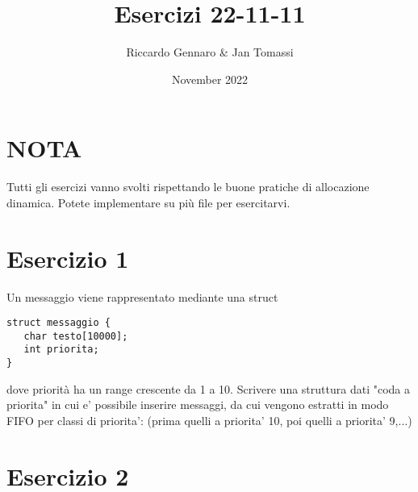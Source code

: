 \documentclass{article}
\title{Esercizi 22-11-11}
\author{Riccardo Gennaro & Jan Tomassi}
\date{November 2022}
\begin{document}
\maketitle

\section*{NOTA}

Tutti gli esercizi vanno svolti rispettando le buone pratiche di allocazione dinamica. Potete implementare su più file per esercitarvi.

\section*{Esercizio 1}

Un messaggio viene rappresentato mediante una struct \\

\begin{verbatim}
struct messaggio {
   char testo[10000];
   int priorita;
}    
\end{verbatim}

dove priorità ha un range crescente da 1 a 10.
Scrivere una struttura dati "coda a priorita" in cui e' possibile inserire messaggi, da cui vengono estratti in modo FIFO per classi di priorita': (prima quelli a priorita' 10, poi quelli a priorita' 9,...)

\section*{Esercizio 2}

    
\end{document}
